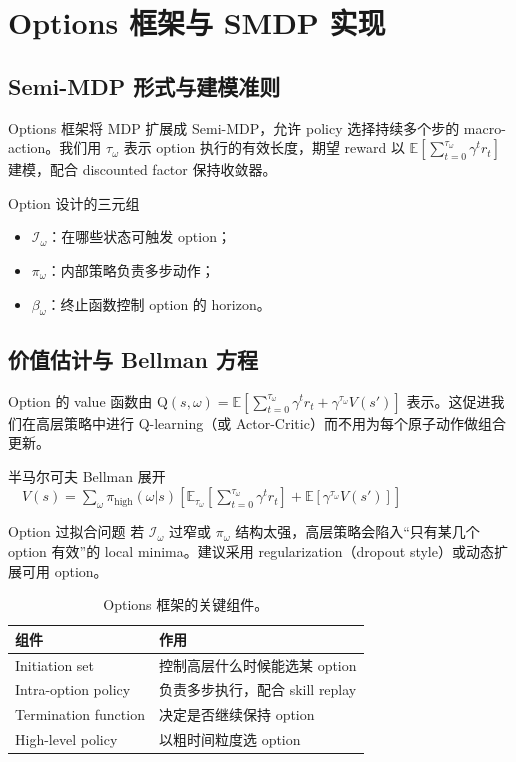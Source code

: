 \section{Options 框架与 SMDP 实现}

\subsection{Semi-MDP 形式与建模准则}

Options 框架将 MDP 扩展成 Semi-MDP，允许 policy 选择持续多个步的 macro-action。我们用 $\tau_\omega$ 表示 option 执行的有效长度，期望 reward 以 $\mathbb{E}\left[\sum_{t=0}^{\tau_\omega} \gamma^t r_t\right]$ 建模，配合 discounted factor 保持收敛器。

\begin{importantbox}{Option 设计的三元组}
\begin{itemize}
    \item $\mathcal{I}_\omega$：在哪些状态可触发 option；
    \item $\pi_\omega$：内部策略负责多步动作；
    \item $\beta_\omega$：终止函数控制 option 的 horizon。
\end{itemize}
\end{importantbox}

\subsection{价值估计与 Bellman 方程}

Option 的 value 函数由 \(\mathrm{Q}(s, \omega) = \mathbb{E}\left[\sum_{t=0}^{\tau_\omega} \gamma^t r_t + \gamma^{\tau_\omega} V(s')\right]\) 表示。这促进我们在高层策略中进行 Q-learning（或 Actor-Critic）而不用为每个原子动作做组合更新。

\begin{knowledgebox}{半马尔可夫 Bellman 展开}
\(\quad V(s)=\sum_\omega \pi_{\text{high}}(\omega|s)\left[\mathbb{E}_{\tau_\omega}\left[\sum_{t=0}^{\tau_\omega}\gamma^t r_t\right]+\mathbb{E}[\gamma^{\tau_\omega}V(s')]\right]\)
\end{knowledgebox}

\begin{warningbox}{Option 过拟合问题}
若 $\mathcal{I}_\omega$ 过窄或 $\pi_\omega$ 结构太强，高层策略会陷入“只有某几个 option 有效”的 local minima。建议采用 regularization（dropout style）或动态扩展可用 option。
\end{warningbox}

\begin{table}[H]
\centering
\begin{tabular}{p{4cm}p{5cm}}
\toprule
组件 & 作用 \\
\midrule
Initiation set & 控制高层什么时候能选某 option \\
Intra-option policy & 负责多步执行，配合 skill replay \\
Termination function & 决定是否继续保持 option \\
High-level policy & 以粗时间粒度选 option \\
\bottomrule
\end{tabular}
\caption{Options 框架的关键组件。}
\end{table}

